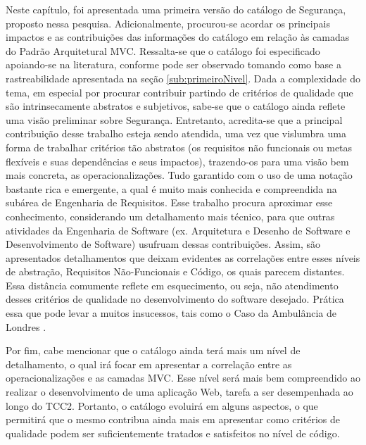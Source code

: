 Neste capítulo, foi apresentada uma primeira versão do catálogo de Segurança, proposto nessa pesquisa. Adicionalmente, procurou-se acordar os principais impactos e as contribuições das informações do catálogo em relação às camadas do Padrão Arquitetural MVC. Ressalta-se que o catálogo foi especificado apoiando-se na literatura, conforme pode ser observado tomando como base a rastreabilidade apresentada na seção \ref{sub:primeiroNivel}.
Dada a complexidade do tema, em especial por procurar contribuir partindo de critérios de qualidade que são intrinsecamente abstratos e subjetivos, sabe-se que o catálogo ainda reflete uma visão preliminar sobre Segurança. Entretanto, acredita-se que a principal contribuição desse trabalho esteja sendo atendida, uma vez que vislumbra uma forma de trabalhar critérios tão abstratos (os requisitos não funcionais ou metas flexíveis e suas dependências e seus impactos), trazendo-os para uma visão bem mais concreta, as operacionalizações. Tudo garantido com o uso de uma notação bastante rica e emergente, a qual é muito mais conhecida e compreendida na subárea de Engenharia de Requisitos. Esse trabalho procura aproximar esse conhecimento, considerando um detalhamento mais técnico, para que outras atividades da Engenharia de Software (ex. Arquitetura e Desenho de Software e Desenvolvimento de Software) usufruam dessas contribuições. Assim, são apresentados detalhamentos que deixam evidentes as correlações entre esses níveis de abstração, Requisitos Não-Funcionais e Código, os quais parecem distantes. Essa distância comumente reflete em esquecimento, ou seja, não atendimento desses critérios de qualidade no desenvolvimento do software desejado. Prática essa que pode levar a muitos insucessos, tais como o Caso da Ambulância de Londres \cite{finkelstein1996comedy}.


Por fim, cabe mencionar que o catálogo ainda terá mais um nível de detalhamento, o qual irá focar em apresentar a correlação entre as operacionalizações e as camadas MVC. Esse nível será mais bem compreendido ao realizar o desenvolvimento de uma aplicação Web, tarefa a ser desempenhada ao longo do TCC2. Portanto, o catálogo evoluirá em alguns aspectos, o que permitirá que o mesmo contribua ainda mais em apresentar como critérios de qualidade podem ser suficientemente tratados e satisfeitos no nível de código.
